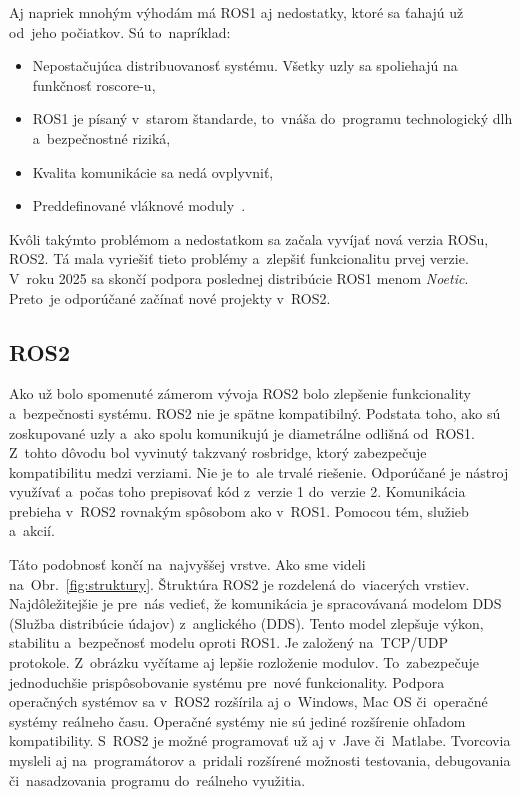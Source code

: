 Aj napriek mnohým výhodám má ROS1 aj nedostatky, ktoré sa ťahajú už od~jeho počiatkov. Sú to~napríklad:

\begin{itemize}
	\item Nepostačujúca distribuovanosť systému. Všetky uzly sa spoliehajú na funkčnosť roscore-u,
	\item ROS1 je písaný v~starom štandarde, to~vnáša do~programu technologický dlh a~bezpečnostné riziká,
	\item Kvalita komunikácie sa nedá ovplyvniť,
	\item Preddefinované vláknové moduly~\cite{ROS2design}.
\end{itemize}

Kvôli takýmto problémom a nedostatkom sa začala vyvíjať nová verzia ROSu, ROS2. Tá mala vyriešiť tieto problémy a~zlepšiť funkcionalitu
prvej verzie. V~roku 2025 sa skončí podpora poslednej distribúcie ROS1 menom \textit{Noetic}. Preto~je odporúčané začínať nové projekty
v~ROS2.

\subsection{ROS2}

Ako už bolo spomenuté zámerom vývoja ROS2 bolo zlepšenie funkcionality a~bezpečnosti systému. ROS2 nie je spätne kompatibilný.
Podstata toho, ako sú zoskupované uzly a~ako spolu komunikujú je diametrálne odlišná od~ROS1. Z~tohto dôvodu bol vyvinutý takzvaný rosbridge,
ktorý zabezpečuje kompatibilitu medzi verziami. Nie je to~ale trvalé riešenie. Odporúčané je nástroj využívať a~počas toho prepisovať kód
z~verzie 1 do~verzie 2. Komunikácia prebieha v~ROS2 rovnakým spôsobom ako v~ROS1. Pomocou tém, služieb a~akcií.

Táto podobnosť končí na~najvyššej vrstve. Ako sme videli na~Obr.~\ref{fig:struktury}. Štruktúra ROS2 je rozdelená do~viacerých vrstiev.
Najdôležitejšie je pre~nás vedieť, že komunikácia je spracovávaná modelom DDS (Služba distribúcie údajov) z~anglického (\acrlong{DDS}). Tento
model zlepšuje výkon, stabilitu a~bezpečnosť modelu oproti ROS1. Je založený na~TCP/UDP protokole. Z~obrázku vyčítame aj lepšie rozloženie
modulov. To~zabezpečuje jednoduchšie prispôsobovanie systému pre~nové funkcionality. Podpora operačných systémov sa v~ROS2 rozšírila aj o~Windows,
Mac OS či~operačné systémy reálneho času. Operačné systémy nie sú jediné rozšírenie ohľadom kompatibility. S~ROS2 je možné programovať už aj
v~Jave či~Matlabe. Tvorcovia mysleli aj na~programátorov a~pridali rozšírené možnosti testovania, debugovania či~nasadzovania programu
do~reálneho využitia.

